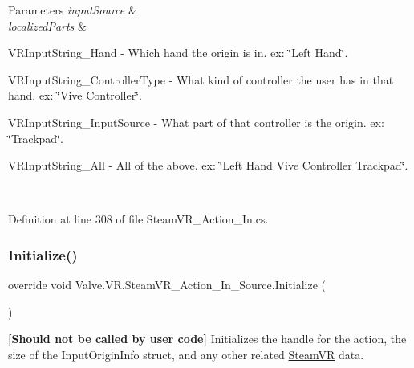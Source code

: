\begin{DoxyParams}{Parameters}
{\em input\+Source} & \\
\hline
{\em localized\+Parts} & 
\begin{DoxyItemize}
\item V\+R\+Input\+String\+\_\+\+Hand -\/ Which hand the origin is in. ex\+: \char`\"{}\+Left Hand\char`\"{}.  
\item V\+R\+Input\+String\+\_\+\+Controller\+Type -\/ What kind of controller the user has in that hand. ex\+: \char`\"{}\+Vive Controller\char`\"{}.  
\item V\+R\+Input\+String\+\_\+\+Input\+Source -\/ What part of that controller is the origin. ex\+: \char`\"{}\+Trackpad\char`\"{}.  
\item V\+R\+Input\+String\+\_\+\+All -\/ All of the above. ex\+: \char`\"{}\+Left Hand Vive Controller Trackpad\char`\"{}.  
\end{DoxyItemize}\\
\hline
\end{DoxyParams}


Definition at line 308 of file Steam\+V\+R\+\_\+\+Action\+\_\+\+In.\+cs.

\mbox{\label{class_valve_1_1_v_r_1_1_steam_v_r___action___in___source_a15f00851d0666c0f9f1836bf481f4f70}} 
\subsubsection{\texorpdfstring{Initialize()}{Initialize()}}
{\footnotesize\ttfamily override void Valve.\+V\+R.\+Steam\+V\+R\+\_\+\+Action\+\_\+\+In\+\_\+\+Source.\+Initialize (\begin{DoxyParamCaption}{ }\end{DoxyParamCaption})\hspace{0.3cm}{\ttfamily [virtual]}}



{\bfseries{\mbox{[}Should not be called by user code\mbox{]}}} Initializes the handle for the action, the size of the Input\+Origin\+Info struct, and any other related \mbox{\hyperlink{class_valve_1_1_v_r_1_1_steam_v_r}{Steam\+VR}} data. 




